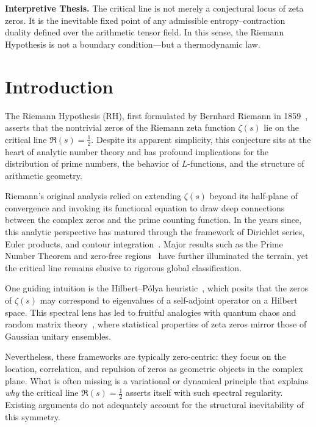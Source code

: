 \documentclass[12pt]{article}
\begin{document}
\medskip

\noindent\textbf{Interpretive Thesis.} The critical line is not merely a conjectural locus of zeta zeros. It is the inevitable fixed point of any admissible entropy–contraction duality defined over the arithmetic tensor field. In this sense, the Riemann Hypothesis is not a boundary condition—but a thermodynamic law.


\section{Introduction}

The Riemann Hypothesis (RH), first formulated by Bernhard Riemann in 1859~\cite{riemann1859}, asserts that the nontrivial zeros of the Riemann zeta function $\zeta(s)$ lie on the critical line $\Re(s) = \tfrac{1}{2}$. Despite its apparent simplicity, this conjecture sits at the heart of analytic number theory and has profound implications for the distribution of prime numbers, the behavior of $L$-functions, and the structure of arithmetic geometry.

Riemann's original analysis relied on extending $\zeta(s)$ beyond its half-plane of convergence and invoking its functional equation to draw deep connections between the complex zeros and the prime counting function. In the years since, this analytic perspective has matured through the framework of Dirichlet series, Euler products, and contour integration~\cite{titchmarsh1986zeta, ivic1985}. Major results such as the Prime Number Theorem and zero-free regions~\cite{montgomery1971topics, selberg1946} have further illuminated the terrain, yet the critical line remains elusive to rigorous global classification.

One guiding intuition is the Hilbert--Pólya heuristic~\cite{polya1913, conrey2003riemann}, which posits that the zeros of $\zeta(s)$ may correspond to eigenvalues of a self-adjoint operator on a Hilbert space. This spectral lens has led to fruitful analogies with quantum chaos and random matrix theory~\cite{keating2000, odlyzko1987}, where statistical properties of zeta zeros mirror those of Gaussian unitary ensembles.

Nevertheless, these frameworks are typically zero-centric: they focus on the location, correlation, and repulsion of zeros as geometric objects in the complex plane. What is often missing is a variational or dynamical principle that explains \emph{why} the critical line $\Re(s) = \tfrac{1}{2}$ asserts itself with such spectral regularity. Existing arguments do not adequately account for the structural inevitability of this symmetry.
\end{document}
